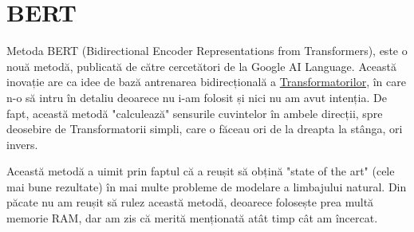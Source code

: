 \section{BERT}

Metoda BERT (Bidirectional Encoder Representations from Transformers), este o nouă metodă, publicată de către 
cercetători de la Google AI Language. Această inovație are ca idee de bază antrenarea bidirecțională a \href{https://www.analyticsvidhya.com/blog/2019/06/understanding-transformers-nlp-state-of-the-art-models/}{Transformatorilor}, 
în care n-o să intru în detaliu deoarece nu i-am folosit și nici nu am avut intenția. De fapt, această metodă "calculează" sensurile
cuvintelor în ambele direcții, spre deosebire de Transformatorii simpli, care o făceau ori de la dreapta la stânga, ori invers.

Această metodă a uimit prin faptul că a reușit să obțină "state of the art" (cele mai bune rezultate) în mai multe probleme
de modelare a limbajului natural. Din păcate nu am reușit să rulez această metodă, deoarece folosește prea multă memorie RAM,
dar am zis că merită menționată atât timp cât am încercat.

